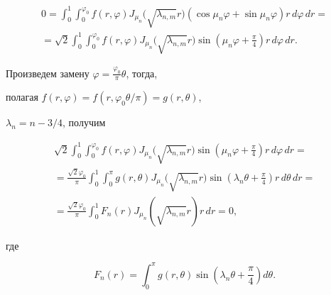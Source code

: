 \begin{multline*}


0=\int_0^1\int_0^{\varphi_0}f(r,\varphi)J_{\mu_n}\big(


\sqrt{\lambda_{n,m}}r\big)(\cos\mu_n\varphi+


\sin\mu_n\varphi)r\,d\varphi\, dr= \\


%


=\sqrt2 \int_0^1\int_0^{\varphi_0}f(r,\varphi)J_{\mu_n}\big(


\sqrt{\lambda_{n,m}}r\big)


\sin\left(\mu_n\varphi+\frac\pi 4\right)r\,d\varphi\,dr.


\end{multline*}


Произведем замену $\varphi={\frac{\varphi_0}{\pi}}\theta$, тогда, 


полагая $f(r,\varphi)=f(r,\varphi_0\theta/\pi)=g(r,\theta)$,


$\lambda_n=n-3/4$, получим


\begin{multline}


\sqrt2 \int_0^1\int_0^{\varphi_0}f(r,\varphi)J_{\mu_n}\big(


\sqrt{\lambda_{n,m}}r\big)


\sin\left(\mu_n\varphi+\frac\pi 4\right)r\,d\varphi\, dr= \\


%


=\frac{\sqrt2\varphi_0}{\pi}\int_0^1\int_0^\pi g(r,\theta)J_{\mu_n}


\big(\sqrt{\lambda_{n,m}}r\big)


\sin\left(\lambda_n\theta+\frac\pi 4\right)r\,d\theta\,dr= \\


%


=\frac{\sqrt 2\varphi_0}{\pi}


\int_0^1F_n(r)J_{\mu_n}\left(\sqrt{\lambda_{n,m}}


r\right)r\,dr=0,\label{1.25}


\end{multline}


где


$$


F_n(r)=\int_0^{\pi}g(r,\theta)\sin\left(\lambda_n\theta+\frac{\pi}{4}


\right)d\theta.


$$





